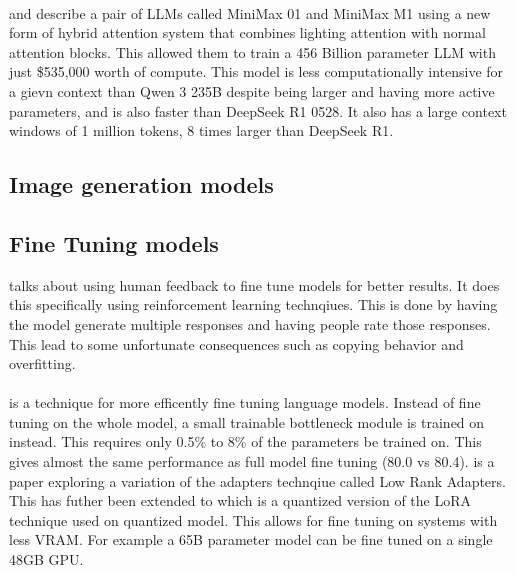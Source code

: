 \paragraph{}\cite{minimax_minimax-01_2025} and \cite{minimax_minimax-m1_2025} describe a pair of LLMs called MiniMax 01 and MiniMax M1 using a new form of hybrid attention system that combines lighting attention with normal attention blocks. This allowed them to train a 456 Billion parameter LLM with just \$535,000 worth of compute. This model is less computationally intensive for a gievn context than Qwen 3 235B despite being larger and having more active parameters, and is also faster than DeepSeek R1 0528. It also has a large context windows of 1 million tokens, 8 times larger than DeepSeek R1.

\subsection{Image generation models}
\paragraph{}

\subsection{Fine Tuning models}
\cite{ziegler_fine-tuning_2020} talks about using human feedback to fine tune models for better results. It does this specifically using reinforcement learning technqiues. This is done by having the model generate multiple responses and having people rate those responses. This lead to some unfortunate consequences such as copying behavior and overfitting.

\paragraph{}\cite{houlsby_parameter-efficient_2019} is a technique for more efficently fine tuning language models. Instead of fine tuning on the whole model, a small trainable bottleneck module is trained on instead. This requires only 0.5\% to 8\% of the parameters be trained on. This gives almost the same performance as full model fine tuning (80.0 vs 80.4). \cite{hu_lora_2021} is a paper exploring a variation of the adapters technqiue called Low Rank Adapters. This has futher been extended to \cite{dettmers_qlora_2023} which is a quantized version of the LoRA technique used on quantized model. This allows for fine tuning on systems with less VRAM. For example a 65B parameter model can be fine tuned on a single 48GB GPU.


